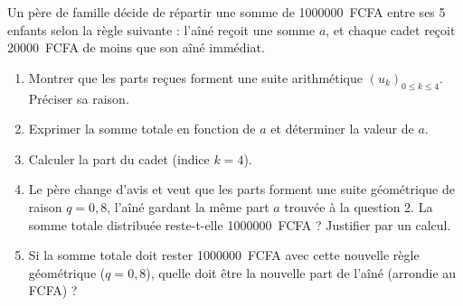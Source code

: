 \documentclass[11pt]{article}
\begin{document}
\begin{exercice}
Un père de famille décide de répartir une somme de \SI{1000000}{FCFA} entre ses 5 enfants selon la règle suivante : l'aîné reçoit une somme $a$, et chaque cadet reçoit \SI{20000}{FCFA} de moins que son aîné immédiat.
\begin{enumerate}
    \item Montrer que les parts reçues forment une suite arithmétique $(u_k)_{0 \le k \le 4}$. Préciser sa raison.
    \item Exprimer la somme totale en fonction de $a$ et déterminer la valeur de $a$.
    \item Calculer la part du cadet (indice $k=4$).
    \item Le père change d'avis et veut que les parts forment une suite géométrique de raison $q=0,8$, l'aîné gardant la même part $a$ trouvée à la question 2. La somme totale distribuée reste-t-elle \SI{1000000}{FCFA} ? Justifier par un calcul.
    \item Si la somme totale doit rester \SI{1000000}{FCFA} avec cette nouvelle règle géométrique ($q=0,8$), quelle doit être la nouvelle part de l'aîné (arrondie au FCFA) ?
\end{enumerate}
\end{exercice}
\end{document}
